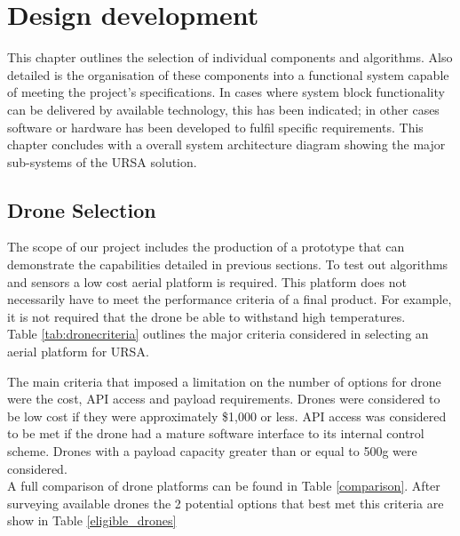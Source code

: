 \documentclass[capstone_report.tex]{subfiles}
\begin{document}
\chapter{Design development}
This chapter outlines the selection of individual components and algorithms. Also detailed is the organisation of these components into a functional system capable of meeting the project's specifications. In cases where system block functionality can be delivered by available technology, this has been indicated; in other cases software or hardware has been developed to fulfil specific requirements. This chapter concludes with a overall system architecture diagram showing the major sub-systems of the URSA solution.

\section{Drone Selection}
The scope of our project includes the production of a prototype that can demonstrate the capabilities detailed in previous sections.  To test out algorithms and sensors a low cost aerial platform is required.  This platform does not necessarily have to meet the performance criteria of a final product. For example, it is not required that the drone be able to withstand high temperatures.\\

Table \ref{tab:dronecriteria} outlines the major criteria considered in selecting an aerial platform for URSA. 

The main criteria that imposed a limitation on the number of options for drone were the cost, API access and payload requirements.  Drones were considered to be low cost if they were approximately \$1,000 or less. API access was considered to be met if the drone had a mature software interface to its internal control scheme. Drones with a payload capacity greater than or equal to 500g were considered.\\

A full comparison of drone platforms can be found in Table \ref{comparison}.  After surveying available drones the 2 potential options that best met this criteria are show in Table \ref{eligible_drones}
\end{document}
